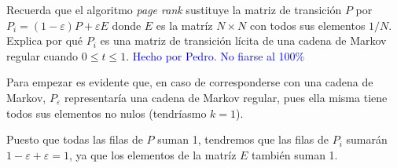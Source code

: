 \begin{problem}[7]
	Recuerda que el algoritmo \textit{page rank} sustituye la matriz de transición $P$ por $P_i = (1-ε)P+εE$ donde $E$ es la matríz $N\times N$ con todos sus elementos $1/N$. Explica por qué $P_i$ es una matriz de transición lícita de una cadena de Markov regular cuando $0 \leq t \leq 1$.
	\solution
	\textcolor{blue}{Hecho por Pedro. No fiarse al 100\%}

	Para empezar es evidente que, en caso de corresponderse con una cadena de Markov, $P_ε$ representaría una cadena de Markov regular, pues ella misma tiene todos sus elementos no nulos (tendríasmo $k=1$).

	Puesto que todas las filas de $P$ suman 1, tendremos que las filas de $P_i$ sumarán $1-ε+ε=1$, ya que los elementos de la matríz $E$ también suman 1.

\end{problem}

